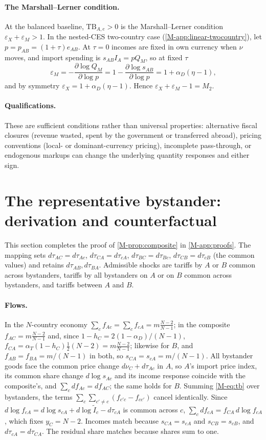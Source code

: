 \documentclass[11pt]{article}
\numberwithin{equation}{section}
\theoremstyle{plain}
\newcommand{\TB}{\mathrm{TB}}
\begin{document}
\paragraph{The Marshall--Lerner condition.} At the balanced baseline, $\TB_{A,e}>0$ is the Marshall--Lerner condition $\varepsilon_X+\varepsilon_M>1$. In the nested-CES two-country case (\cref{M-app:linear-twocountry}), let $p=p_{AB}=(1+\tau)e_{AB}$. At $\tau=0$ incomes are fixed in own currency when $\nu$ moves, and import spending is $s_{AB}I_A=pQ_M$, so at fixed $\tau$
\begin{equation*}
\varepsilon_M=-\frac{\partial\log Q_M}{\partial\log p}=1-\frac{\partial\log s_{AB}}{\partial\log p}=1+\alpha_D(\eta-1),
\end{equation*}
and by symmetry $\varepsilon_X=1+\alpha_D(\eta-1)$. Hence $\varepsilon_X+\varepsilon_M-1=M_2$.

\paragraph{Qualifications.} These are sufficient conditions rather than universal properties: alternative fiscal closures (revenue wasted, spent by the government or transferred abroad), pricing conventions (local- or dominant-currency pricing), incomplete pass-through, or endogenous markups can change the underlying quantity responses and either sign.

\section{The representative bystander: derivation and counterfactual}

This section completes the proof of \cref{M-prop:composite} in \cref{M-app:proofs}. The mapping sets $d\tau_{AC}=d\tau_{Ac}$, $d\tau_{CA}=d\tau_{cA}$, $d\tau_{BC}=d\tau_{Bc}$, $d\tau_{CB}=d\tau_{cB}$ (the common values) and retains $d\tau_{AB},d\tau_{BA}$. Admissible shocks are tariffs by $A$ or $B$ common across bystanders, tariffs by all bystanders on $A$ or on $B$ common across bystanders, and tariffs between $A$ and $B$.

\paragraph{Flows.} In the $N$-country economy $\sum_cf_{Ac}=\sum_cf_{cA}=m\frac{N-2}{N-1}$; in the composite $f_{AC}=m\frac{N-2}{N-1}$ and, since $1-h_C=2(1-\alpha_D)/(N-1)$, $f_{CA}=\alpha_T(1-h_C)\tfrac12(N-2)=m\frac{N-2}{N-1}$; likewise for $B$, and $f_{AB}=f_{BA}=m/(N-1)$ in both, so $s_{CA}=s_{cA}=m/(N-1)$. All bystander goods face the common price change $d\nu_C+d\tau_{Ac}$ in $A$, so $A$'s import price index, its common share change $d\log s_{Ac}$ and its income response coincide with the composite's, and $\sum_cdf_{Ac}=df_{AC}$; the same holds for $B$. Summing \cref{M-eq:tb} over bystanders, the terms $\sum_c\sum_{c'\neq c}(f_{c'c}-f_{cc'})$ cancel identically. Since $d\log f_{cA}=d\log s_{cA}+d\log\tilde I_c-d\tau_{cA}$ is common across $c$, $\sum_cdf_{cA}=f_{CA}\,d\log f_{cA}$, which fixes $y_C=N-2$. Incomes match because $s_{CA}=s_{cA}$ and $s_{CB}=s_{cB}$, and $d\tau_{cA}=d\tau_{CA}$. The residual share matches because shares sum to one.
\end{document}
